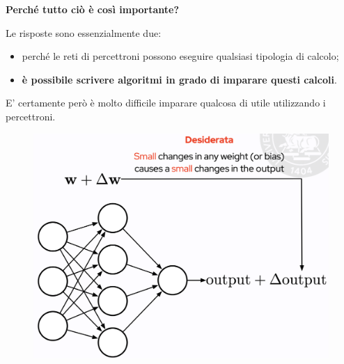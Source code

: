 \textbf{Perché tutto ciò è così importante?}


Le risposte sono essenzialmente due:
\begin{itemize}
    \item perché le reti di percettroni possono eseguire qualsiasi tipologia di calcolo;
    \item \textbf{è possibile scrivere algoritmi in grado di imparare questi calcoli}.
\end{itemize}
\newpage
E' certamente però è molto difficile imparare qualcosa di utile utilizzando i percettroni.
\begin{figure}[!h]
    \includegraphics[scale=.3]{images/gradient_descent/sigmoid01.png}
    \centering
\end{figure}
